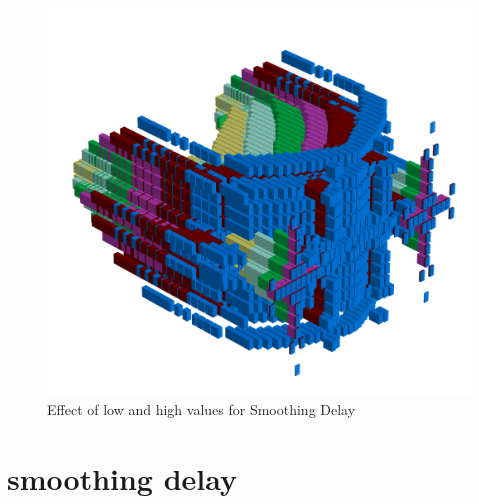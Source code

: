 \begin{figure}[H]
\begin{adjustbox}{width=10.5cm,margin=0cm -2cm}
      \includegraphics[width=12cm]{src/delay/pattern1-45.png}%
    \end{adjustbox}
    \caption{Effect of low and high values for Smoothing Delay}
\end{figure}
\clearpage

\section*{smoothing delay} 
\label{sec:delay}
\lstset{style=6502Style}
\lstset{ 
   aboveskip=5pt,
   belowskip=0pt,
}


